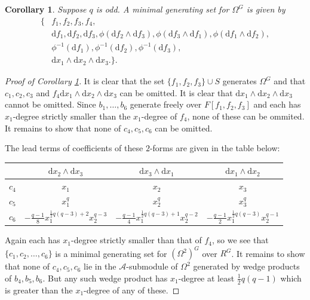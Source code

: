 \documentclass[10pt,a4paper]{amsart}
\newcommand{\dd}{\mathrm{d}}
\theoremstyle{plain}
\newtheorem{Corollary}[Lemma]{Corollary}
\newtheorem*{Corollary of Conjecture}{Corollary of Conjecture}
\theoremstyle{definition}
\theoremstyle{remark}
\begin{document}
\begin{Corollary}\label{oddmin}
Suppose $q$ is odd. A minimal generating set for $\Omega^G$ is given by
\begin{align*}\{&f_1,f_2,f_3,f_4,\\ &\dd f_1, \dd f_2, \dd f_3, \phi(\dd f_2 \wedge \dd f_3), \phi(\dd f_3 \wedge \dd f_1), \phi(\dd f_1 \wedge \dd f_2),\\
&\phi^{-1}(\dd f_1), \phi^{-1}(\dd f_2), \phi^{-1}(\dd f_3), \\
& \dd x_1 \wedge \dd x_2 \wedge \dd x_3.\}.\end{align*}
\end{Corollary}

\begin{proof}[Proof of Corollary \ref{oddmin}]
It is clear that the set $\{f_1,f_2,f_3\} \cup S$ generates $\Omega^G$ and that $c_1,c_2,c_3$ and $f_4 \dd x_1 \wedge \dd x_2 \wedge \dd x_3$ can be omitted. It is clear that $\dd x_1 \wedge \dd x_2 \wedge \dd x_3$ cannot be omitted. Since $b_1, \ldots, b_6$ generate freely over $F[f_1,f_2,f_3]$ and each has $x_1$-degree strictly smaller than the $x_1$-degree of $f_4$, none of these can be ommited. It remains to show that none of $c_4,c_5, c_6$ can be omitted.

The lead terms of coefficients of these $2$-forms are given in the table below:

\vspace{1cm}
\begin{tabular}{|c||c|c|c|} \hline
 & $\dd x_2 \wedge \dd x_3$ &  $\dd x_3 \wedge \dd x_1$ &  $\dd x_1 \wedge \dd x_2$ \\ \hline \hline
$c_4$  & $x_1$ & $x_2$  & $x_3$\\ \hline
$c_5$  &  $x_1^q$ &  $x_2^q$ & $x_3^q$\\ \hline
$c_6$  &  $-\frac{q-1}{8}x_1^{\frac12 q(q-3)+2}x_2^{q-3}$ & $-\frac{q-1}{4}x_1^{\frac12 q(q-3)+1}x_2^{q-2}$  & $-\frac{q-1}{2}x_1^{\frac12 q(q-3)}x_2^{q-1}$\\ \hline
\end{tabular}
\vspace{1cm}

Again each has $x_1$-degree strictly smaller than that of $f_4$, so we see that $\{c_1,c_2, \ldots, c_6\}$ is a minimal generating set for $(\Omega^2)^G$ over $R^G$. It remains to show that none of $c_4,c_5,c_6$ lie in the $\mathcal{A}$-submodule of $\Omega^2$ generated by wedge products of $b_4,b_5, b_6$. But any such wedge product has $x_1$-degree at least $\frac12 q(q-1)$ which is greater than the $x_1$-degree of any of these.
 \end{proof}
\end{document}
